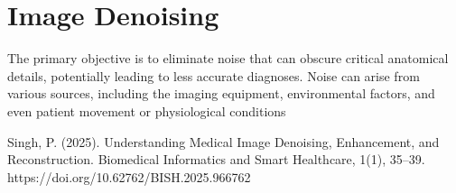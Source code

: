 \chapter{Image Denoising}

The primary objective is to eliminate noise that can obscure critical anatomical details, potentially leading to less accurate diagnoses. Noise can arise from various sources, including the imaging equipment, environmental factors, and even patient movement or physiological conditions

Singh, P. (2025). Understanding Medical Image Denoising, Enhancement, and Reconstruction. Biomedical Informatics and Smart Healthcare, 1(1), 35–39. https://doi.org/10.62762/BISH.2025.966762

